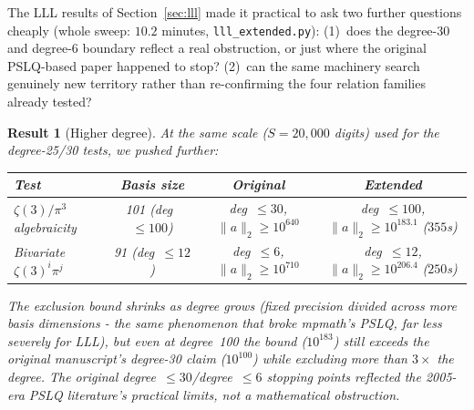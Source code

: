 \documentclass[12pt]{article}
\newtheorem{result}[theorem]{Result}
\theoremstyle{definition}
\theoremstyle{remark}
\begin{document}
The LLL results of Section~\ref{sec:lll} made it practical to ask two
further questions cheaply (whole sweep: $10.2$ minutes,
\texttt{lll\_extended.py}): (1)~does the degree-30 and degree-6
boundary reflect a real obstruction, or just where the original
PSLQ-based paper happened to stop? (2)~can the same machinery search
genuinely new territory rather than re-confirming the four relation
families already tested?

\begin{result}[Higher degree]\label{res:extended-degree}
At the same scale ($S=20{,}000$ digits) used for the degree-25/30
tests, we pushed further:
\begin{center}
\begin{tabular}{@{}lccc@{}}
\toprule
Test & Basis size & Original & Extended \\
\midrule
$\zeta(3)/\pi^3$ algebraicity & 101 (deg~$\le 100$) &
  deg~$\le 30$, $\|a\|_2\ge 10^{640}$ &
  deg~$\le 100$, $\|a\|_2\ge 10^{183.1}$ ($355$s) \\
Bivariate $\zeta(3)^i\pi^j$ & 91 (deg~$\le 12$) &
  deg~$\le 6$, $\|a\|_2\ge 10^{710}$ &
  deg~$\le 12$, $\|a\|_2\ge 10^{206.4}$ ($250$s) \\
\bottomrule
\end{tabular}
\end{center}
The exclusion bound shrinks as degree grows (fixed precision divided
across more basis dimensions - the same phenomenon that broke
mpmath's PSLQ, far less severely for LLL), but even at degree~100 the
bound ($10^{183}$) still exceeds the original manuscript's degree-30
claim ($10^{100}$) while excluding more than $3\times$ the degree.
The original degree~$\le 30$/degree~$\le 6$ stopping points reflected
the 2005-era PSLQ literature's practical limits, not a mathematical
obstruction.
\end{result}
\end{document}
